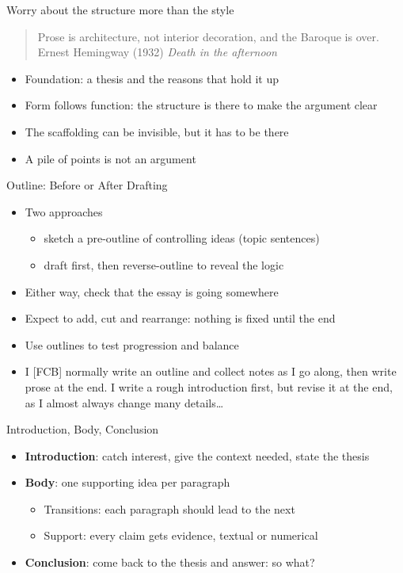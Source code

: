 \documentclass[aspectratio=169]{beamer}
\begin{document}
\begin{frame}{Worry about the structure more than the style}
  \begin{quote}
    Prose is architecture, not interior decoration, and the Baroque is over.
    \\
    \hfill \textnormal{Ernest Hemingway (1932) \textit{Death in the afternoon}}
  \end{quote}
\begin{itemize}
  \item Foundation: a thesis and the reasons that hold it up
  \item Form follows function: the structure is there to make the argument clear
  \item The scaffolding can be invisible, but it has to be there
  \item A pile of points is not an argument
  \end{itemize}

\end{frame}


\begin{frame}{Outline: Before or After Drafting}
  \begin{itemize}
  \item Two approaches
    \begin{itemize}
    \item[A] sketch a pre-outline of controlling ideas (topic sentences)
    \item[B] draft first, then reverse-outline to reveal the logic
    \end{itemize}
  \item Either way, check that the essay is going somewhere
  \item Expect to add, cut and rearrange: nothing is fixed until the end
  \item Use outlines to test progression and balance\\[2ex]

  \item I [FCB] normally write an outline and collect notes as I go along, then write prose at the end.  I write a rough introduction first, but revise it at the end, as I almost always change many details\ldots
\end{itemize}
\end{frame}

\begin{frame}{Introduction, Body, Conclusion}
\begin{itemize}
  \item \textbf{Introduction}: catch interest, give the context needed, state the thesis
  \item \textbf{Body}: one supporting idea per paragraph
    \begin{itemize}
    \item Transitions: each paragraph should lead to the next
    \item Support: every claim gets evidence, textual or numerical
    \end{itemize}
  \item \textbf{Conclusion}: come back to the thesis and answer: so what?
\end{itemize}
\end{frame}
\end{document}
